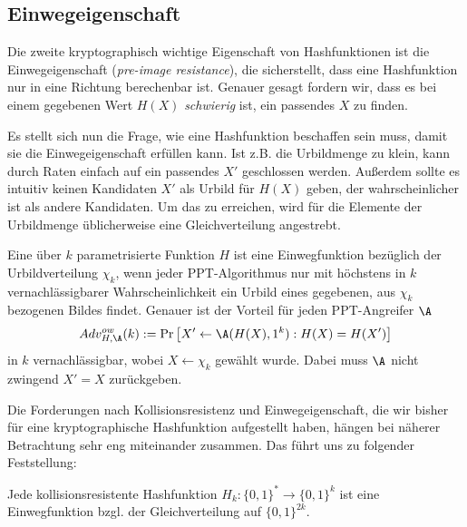 \subsection{Einwegeigenschaft}
Die zweite kryptographisch wichtige Eigenschaft von Hashfunktionen ist
die Einwegeigenschaft (\emph{pre-image
resistance})\indexPreImageResistance, die sicherstellt, dass eine
Hashfunktion nur in eine Richtung berechenbar ist. Genauer gesagt
fordern wir, dass es bei einem gegebenen Wert $H(X)$ \emph{schwierig}
ist, ein passendes $X$ zu finden.

Es stellt sich nun die Frage, wie eine Hashfunktion beschaffen sein
muss, damit sie die Einwegeigenschaft erfüllen kann. Ist z.B. die
Urbildmenge zu klein, kann durch Raten einfach auf ein passendes $X'$
geschlossen werden. Außerdem sollte es intuitiv keinen Kandidaten $X'$
als Urbild für $H(X)$ geben, der wahrscheinlicher ist als andere
Kandidaten. Um das zu erreichen, wird für die Elemente der Urbildmenge
üblicherweise eine Gleichverteilung angestrebt.

\begin{definition}[Einwegfunktion]
Eine über $k$ parametrisierte Funktion $H$ ist eine Einwegfunktion
\indexPreImageResistance bezüglich der Urbildverteilung $\chi_k$, wenn
jeder PPT-Algorithmus nur mit höchstens in $k$ vernachlässigbarer
Wahrscheinlichkeit ein Urbild eines gegebenen, aus $\chi_k$ bezogenen
Bildes findet. Genauer ist der Vorteil für jeden PPT-Angreifer $\A$
\begin{equation*}
Adv^{ow}_{H,\A}(k):= \Pr \left[ X' \leftarrow \A(H(X), 1^k) : H(X) = H(X')\right]
\end{equation*} 
in $k$ vernachlässigbar, wobei $X \leftarrow \chi_k$ gewählt
wurde. Dabei muss $\A$ nicht zwingend $X' = X$ zurückgeben.
\end{definition}

Die Forderungen nach Kollisionsresistenz und Einwegeigenschaft, die wir
bisher für eine kryptographische Hashfunktion aufgestellt haben, hängen
bei näherer Betrachtung sehr eng miteinander
zusammen\indexCollisionResistance\indexPreImageResistance. Das führt uns
zu folgender Feststellung:

\begin{theorem}
Jede kollisionsresistente Hashfunktion $H_k \colon \{0,1\}^* \rightarrow
\{0,1\}^k$ ist eine Einwegfunktion bzgl. der Gleichverteilung auf
$\{0,1\}^{2k}$. 
\end{theorem}

